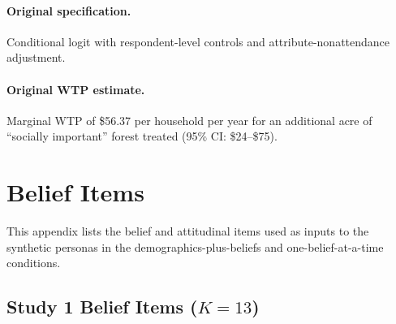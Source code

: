 \documentclass[12pt]{article}
\begin{document}
\paragraph{Original specification.} Conditional logit with respondent-level controls and attribute-nonattendance adjustment.

\paragraph{Original WTP estimate.} Marginal WTP of \$56.37 per household per year for an additional acre of ``socially important'' forest treated (95\% CI: \$24--\$75).

\section{Belief Items}\label{app:belief-items}

This appendix lists the belief and attitudinal items used as inputs to the synthetic personas in the demographics-plus-beliefs and one-belief-at-a-time conditions.

\subsection{Study 1 Belief Items ($K = 13$)}
\end{document}
